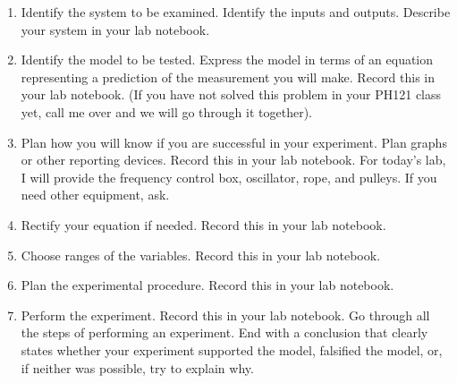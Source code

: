 \documentclass{book}
\begin{document}
\begin{enumerate}
\item Identify the system to be examined. Identify the inputs and
outputs. Describe your system in your lab notebook.

\item Identify the model to be tested. Express the model in terms of
an equation representing a prediction of the measurement you will make. Record
this in your lab notebook. (If you have not solved this problem in your PH121
class yet, call me over and we will go through it together).

\item Plan how you will know if you are successful in your experiment.
Plan graphs or other reporting devices. Record this in your lab notebook. For
today's lab, I will provide the frequency control box, oscillator, rope, and pulleys. If you need
other equipment, ask.

\item Rectify your equation if needed. Record this in your lab
notebook.

\item Choose ranges of the variables. Record this in your lab
notebook.

\item Plan the experimental procedure. Record this in your lab
notebook.

\item Perform the experiment. Record this in your lab notebook. Go
through all the steps of performing an experiment. End with a conclusion that
clearly states whether your experiment supported the model, falsified the
model, or, if neither was possible, try to explain why.
\end{enumerate}
\end{document}
